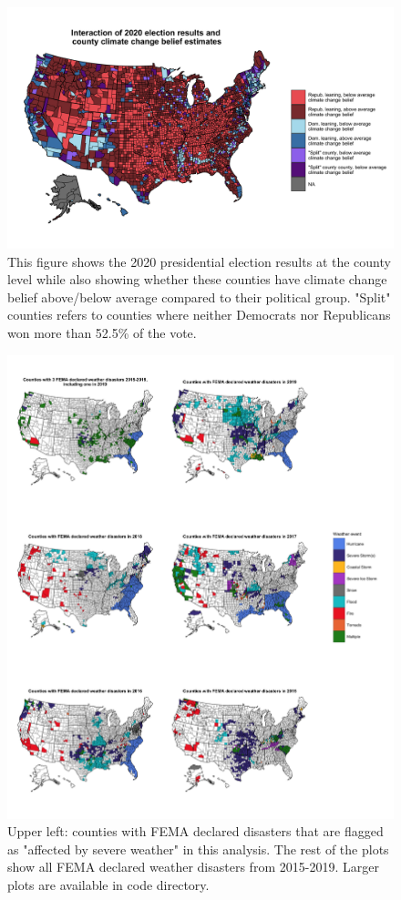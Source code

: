 \documentclass{article}
\begin{document}
\begin{figure}[H]
\includegraphics[scale=0.225]{images/election_climate_beliefs_map_in_group_comp.png}
\caption{This figure shows the 2020 presidential election results at the county level while also showing whether these counties have climate change belief above/below average compared to their political group. "Split" counties refers to counties where neither Democrats nor Republicans won more than 52.5\% of the vote.}
\end{figure}


\begin{figure}[H]
\includegraphics[scale=0.175]{images/fema_events_maps_combined.png}
\caption{Upper left: counties with FEMA declared disasters that are flagged as "affected by severe weather" in this analysis. The rest of the plots show all FEMA declared weather disasters from 2015-2019. Larger plots are available in code directory.}
\end{figure}
\end{document}
